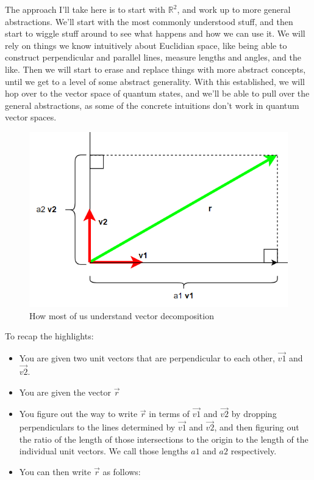 \documentclass[
]{book}
\providecommand{\tightlist}{%
  \setlength{\itemsep}{0pt}\setlength{\parskip}{0pt}}
\begin{document}
The approach I'll take here is to start with \(\mathbb{R}^2\), and work up to more general abstractions. We'll start with the most commonly understood stuff, and then start to wiggle stuff around to see what happens and how we can use it. We will rely on things we know intuitively about Euclidian space, like being able to construct perpendicular and parallel lines, measure lengths and angles, and the like. Then we will start to erase and replace things with more abstract concepts, until we get to a level of some abstract generality. With this established, we will hop over to the vector space of quantum states, and we'll be able to pull over the general abstractions, as some of the concrete intuitions don't work in quantum vector spaces.

\begin{figure}

{\centering \includegraphics[width=0.75\linewidth,height=0.75\textheight]{images/orthonormal-decomposition} 

}

\caption{How most of us understand vector decomposition}\label{fig:unnamed-chunk-4}
\end{figure}

To recap the highlights:

\begin{itemize}
\tightlist
\item
  You are given two unit vectors that are perpendicular to each other, \(\vec{v1}\) and \(\vec{v2}\).
\item
  You are given the vector \(\vec{r}\)
\item
  You figure out the way to write \(\vec{r}\) in terms of \(\vec{v1}\) and \(\vec{v2}\) by dropping perpendiculars to the lines determined by \(\vec{v1}\) and \(\vec{v2}\), and then figuring out the ratio of the length of those intersections to the origin to the length of the individual unit vectors. We call those lengths \(a1\) and \(a2\) respectively.
\item
  You can then write \(\vec{r}\) as follows:
\end{itemize}
\end{document}
